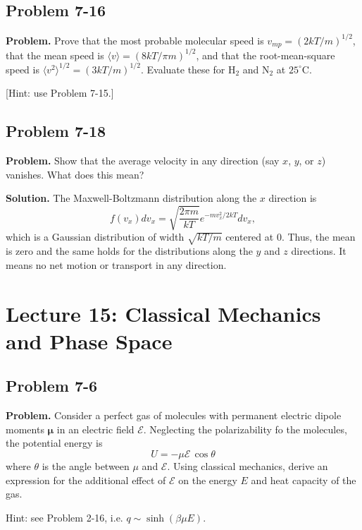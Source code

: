 \documentclass[twocolumn, 10pt]{article}
\numberwithin{equation}{section}
\newenvironment{problem}
{\par\medskip\sffamily \color{problue}
  \textbf{Problem. }\ignorespaces}
{\medskip}
\newenvironment{solution}
{\par\medskip
  \textbf{Solution. }\ignorespaces}
{\medskip}
\begin{document}
\subsection{Problem 7-16}

\begin{problem}
  Prove that the most probable molecular speed is
  $v_{mp} = (2kT/m)^{1/2}$,
  that the mean speed is
  $\langle v \rangle = (8kT/\pi m)^{1/2}$,
  and that the root-mean-square speed is
  $\langle v^2 \rangle^{1/2} = (3kT/m)^{1/2}$.
  Evaluate these for $\mathrm{H}_2$ and $\mathrm{N}_2$
  at $25^{\circ}\mathrm{C}$.

  [Hint: use Problem 7-15.]
\end{problem}


\subsection{Problem 7-18}

\begin{problem}
  Show that the average velocity in any direction
  (say $x$, $y$, or $z$) vanishes.
  What does this mean?
\end{problem}

\begin{solution}
  [Due to Dr. Pettitt.]
  The Maxwell-Boltzmann distribution along the $x$ direction is
  $$
  f(v_x) d v_x = \sqrt{\frac{2\pi m }{kT}} e^{-m v_x^2/2kT} d v_x,
  $$
  which is a Gaussian distribution of width $\sqrt{kT/m}$
  centered at $0$.
  Thus, the mean is zero
  and the same holds for the distributions
  along the $y$ and $z$ directions.
  It means no net motion or transport in any direction.
\end{solution}

\section{Lecture 15: Classical Mechanics and Phase Space}

\subsection{Problem 7-6}

\begin{problem}
  Consider a perfect gas of molecules
  with permanent electric dipole moments $\boldsymbol \mu$
  in an electric field $\mathscr E$.
  Neglecting the polarizability fo the molecules,
  the potential energy is
  $$
  U = -\mu \mathscr E \, \cos\theta
  $$
  where $\theta$ is the angle between $\mu$
  and $\mathscr E$.
  Using classical mechanics,
  derive an expression for the additional effect of $\mathscr E$
  on the energy $E$ and heat capacity of the gas.

  Hint: see Problem 2-16, i.e. $q \sim \sinh(\beta \mu E)$.
\end{problem}
\end{document}
